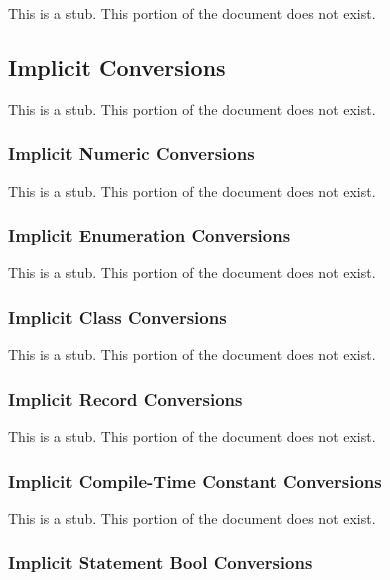 \label{Conversions}

This is a stub.  This portion of the document does not exist.

\subsection{Implicit Conversions}
\label{Implicit_Conversions}

This is a stub.  This portion of the document does not exist.

\subsubsection{Implicit Numeric Conversions}
\label{Implicit_Numeric_Conversions}

This is a stub.  This portion of the document does not exist.

\subsubsection{Implicit Enumeration Conversions}
\label{Implicit_Enumeration_Conversions}

This is a stub.  This portion of the document does not exist.

\subsubsection{Implicit Class Conversions}
\label{Implicit_Class_Conversions}

This is a stub.  This portion of the document does not exist.

\subsubsection{Implicit Record Conversions}
\label{Implicit_Record_Conversions}

This is a stub.  This portion of the document does not exist.

\subsubsection{Implicit Compile-Time Constant Conversions}
\label{Implicit_Compile-Time_Constant_Conversions}

This is a stub.  This portion of the document does not exist.

\subsubsection{Implicit Statement Bool Conversions}
\label{Implicit_Statement_Bool_Conversions}

